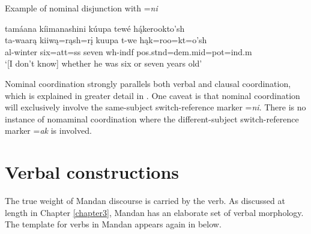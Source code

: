 \begin{exe}
    \item\label{Ch5ExNIDisjunction} Example of nominal disjunction with =\textit{ni}

    \glll tamáana kíimanashini kúupa tewé hą́kerookto'sh\\
    ta-waarą kiiwą=rąsh=rį kuupa t-we hąk=roo=kt=o'sh\\
    al-\textnormal{winter} \textnormal{six}=att=ss \textnormal{seven} wh-indf pos.stnd=dem.mid=pot=ind.m\\
    \glt `[I don't know] whether he was six or seven years old' \citep[195]{hollow1973a}
\end{exe}

Nominal coordination strongly parallels both verbal and clausal coordination, which is explained in greater detail in . One caveat is that nominal coordination will exclusively involve the same-subject switch-reference marker =\textit{ni}. There is no instance of nomaminal coordination where the different-subject switch-reference marker =\textit{ak} is involved.

\section{Verbal constructions}\label{Ch5Verbs}

The true weight of Mandan discourse is carried by the verb. As discussed at length in Chapter \ref{chapter3}, Mandan has an elaborate set of verbal morphology. The template for verbs in Mandan appears again in  below.

\begin{table}
\caption{Prefix field in Mandan}\label{prefixfieldmandanREredux2}

\end{table}

